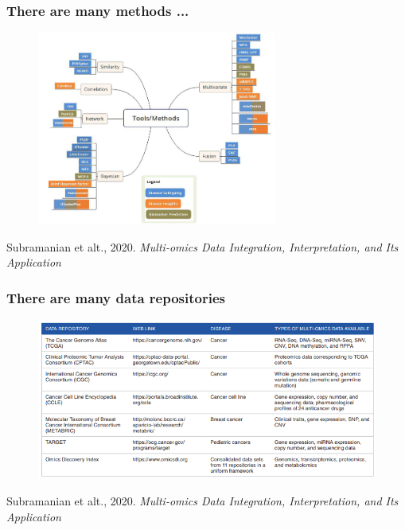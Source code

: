 \documentclass{beamer}
\begin{document}
   
   \begin{frame}
   	\frametitle{There are many methods ...}
\vspace{-0.5cm}
   		\begin{figure}[ht]
   			\centering
   			\includegraphics[width=0.7\textwidth]{images/IODAmethods2020.png}
   		\end{figure} 
\vspace{-0.5cm}   	{\tiny Subramanian et alt., 2020. \textit{Multi-omics Data Integration, Interpretation, and Its Application}}
   \end{frame}
  
  
   \begin{frame}
   	\frametitle{There are many data repositories}
 \vspace{-1 cm}
   	\begin{figure}[ht]
   		\centering
   		\includegraphics[height=0.7\textheight]{images/IODADataRepositories2020.png}
   	\end{figure}
\vspace{-0.5cm}   	{\tiny Subramanian et alt., 2020. \textit{Multi-omics Data Integration, Interpretation, and Its Application}}
   \end{frame}
   
\end{document}
